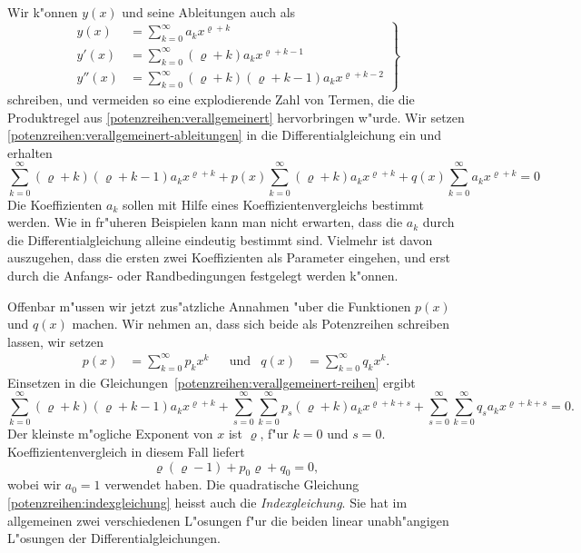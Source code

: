 Wir k"onnen $y(x)$ und seine Ableitungen auch als
\begin{equation}
\left.
\begin{aligned}
y(x)
&=
\sum_{k=0}^\infty a_kx^{\varrho+k}
\\
y'(x)
&=
\sum_{k=0}^\infty (\varrho+k)a_kx^{\varrho+k-1}
\\
y''(x)
&=
\sum_{k=0}^\infty (\varrho+k)(\varrho+k-1)a_kx^{\varrho+k-2}
\end{aligned}
\right\}
\label{potenzreihen:verallgemeinert-ableitungen}
\end{equation}
schreiben, und vermeiden so eine explodierende Zahl von Termen, die
die Produktregel aus \eqref{potenzreihen:verallgemeinert}
hervorbringen w"urde.
Wir setzen \eqref{potenzreihen:verallgemeinert-ableitungen}
in die Differentialgleichung ein und erhalten
\begin{equation}
\sum_{k=0}^\infty (\varrho+k)(\varrho+k-1)a_kx^{\varrho+k}
+p(x)
\sum_{k=0}^\infty (\varrho+k)a_kx^{\varrho+k}
+q(x)
\sum_{k=0}^\infty a_kx^{\varrho+k}
=0
\label{potenzreihen:verallgemeinert-reihen}
\end{equation}
Die Koeffizienten $a_k$ sollen mit Hilfe eines Koeffizientenvergleichs
bestimmt werden.
Wie in fr"uheren Beispielen kann man nicht erwarten, dass die $a_k$
durch die Differentialgleichung alleine eindeutig bestimmt sind.
Vielmehr ist davon auszugehen, dass die ersten zwei Koeffizienten
als Parameter eingehen, und erst durch die Anfangs- oder Randbedingungen
festgelegt werden k"onnen.

Offenbar m"ussen wir jetzt zus"atzliche Annahmen "uber die
Funktionen $p(x)$ und $q(x)$ machen.
Wir nehmen an, dass sich beide als Potenzreihen schreiben lassen,
wir setzen
\begin{equation*}
\begin{aligned}
p(x)&=\sum_{k=0}^\infty p_kx^k&&\text{und}
&
q(x)&=\sum_{k=0}^\infty q_kx^k.
\end{aligned}
\end{equation*}
Einsetzen in die Gleichungen~\eqref{potenzreihen:verallgemeinert-reihen}
ergibt
\begin{equation*}
\sum_{k=0}^\infty (\varrho+k)(\varrho+k-1)a_kx^{\varrho+k}
+\sum_{s=0}^\infty
\sum_{k=0}^\infty p_s(\varrho+k)a_kx^{\varrho+k+s}
+
\sum_{s=0}^\infty
\sum_{k=0}^\infty q_sa_kx^{\varrho+k+s}
=0.
\end{equation*}
Der kleinste m"ogliche Exponent von $x$ ist $\varrho$, f"ur $k=0$ und $s=0$.
Koeffizientenvergleich in diesem Fall liefert
\begin{equation}
\varrho(\varrho-1)+p_0\varrho +q_0=0,
\label{potenzreihen:indexgleichung}
\end{equation}
wobei wir $a_0=1$ verwendet haben.
Die quadratische Gleichung \eqref{potenzreihen:indexgleichung} heisst auch die
{\em Indexgleichung}.
Sie hat im allgemeinen zwei verschiedenen L"osungen f"ur die beiden
linear unabh"angigen L"osungen der Differentialgleichungen.

